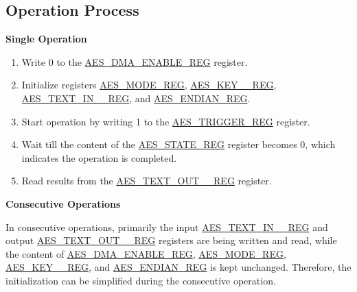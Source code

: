 \documentclass[main\_\_EN.tex]{subfiles}
\begin{document}

\subsection{Operation Process }

\textbf{Single Operation}

\begin{enumerate}
    \item Write 0 to the \hyperref[regdesc:AESDMAENABLEREG]{AES\_DMA\_ENABLE\_REG} register.
    \item Initialize registers \hyperref[regdesc:AESMODEREG]{AES\_MODE\_REG}, \hyperref[regdesc:AESKEYnREG]{AES\_KEY\_\_REG}, \hyperref[regdesc:AESTEXTINnREG]{AES\_TEXT\_IN\_\_REG}, and \hyperref[regdesc:AESENDIANREG]{AES\_ENDIAN\_REG}.
    \item Start operation by writing 1 to the \hyperref[regdesc:AESTRIGGERREG]{AES\_TRIGGER\_REG} register.
    \item Wait till the content of the \hyperref[regdesc:AESSTATEREG]{AES\_STATE\_REG} register becomes 0, which indicates the operation is completed.
    \item Read results from the \hyperref[regdesc:AESTEXTOUTnREG]{AES\_TEXT\_OUT\_\_REG} register.
\end{enumerate}

\textbf{Consecutive Operations}

In consecutive operations, primarily the input \hyperref[regdesc:AESTEXTINnREG]{AES\_TEXT\_IN\_\_REG} and output \hyperref[regdesc:AESTEXTOUTnREG]{AES\_TEXT\_OUT\_\_REG} registers are being written and read, while the content of \hyperref[regdesc:AESDMAENABLEREG]{AES\_DMA\_ENABLE\_REG}, \hyperref[regdesc:AESMODEREG]{AES\_MODE\_REG}, \hyperref[regdesc:AESKEYnREG]{AES\_KEY\_\_REG}, and \hyperref[regdesc:AESENDIANREG]{AES\_ENDIAN\_REG} is kept unchanged. Therefore, the initialization can be simplified during the consecutive operation.
\end{document}
